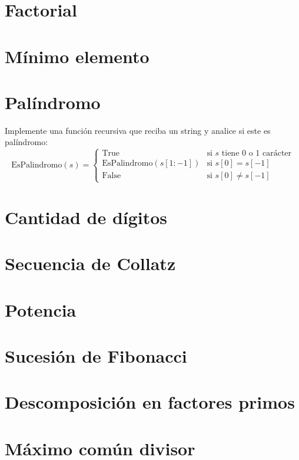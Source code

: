 \section{Factorial}


\section{Mínimo elemento}


\section{Palíndromo}
Implemente una función recursiva que reciba un string y analice si este es palíndromo:
\[
\text{EsPalindromo}(s) = 
\begin{cases} 
\text{True} & \text{si } s \text{ tiene 0 o 1 carácter} \\
\text{EsPalindromo}(s[1:-1]) & \text{si } s[0] = s[-1] \\
\text{False} & \text{si } s[0] \neq s[-1]
\end{cases}
\]

\section{Cantidad de dígitos}


\section{Secuencia de Collatz}


\section{Potencia}


\section{Sucesión de Fibonacci}


\section{Descomposición en factores primos}


\section{Máximo común divisor}


